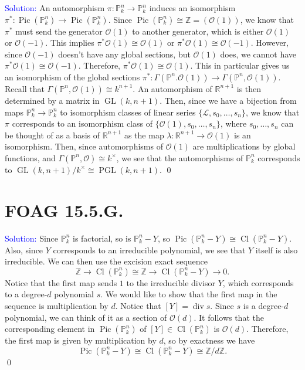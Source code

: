 \documentclass[11pt]{article}
\newcommand{\PP}{\mathbb{P}}
\newcommand{\RR}{\mathbb{R}}
\newcommand{\ZZ}{\mathbb{Z}}
\newcommand{\cL}{\mathcal{L}}
\newcommand{\cO}{\mathcal{O}}
\newcommand{\Div}{\operatorname{div}}
\newcommand{\Pic}{\operatorname{Pic}}
\newcommand{\Cl}{\operatorname{Cl}}
\newcommand{\GL}{\operatorname{GL}}
\newcommand{\PGL}{\operatorname{PGL}}
\newenvironment{solution}{\begin{trivlist}\item[]{\textcolor{blue}{Solution:}}}{\qed \end{trivlist}}
\begin{document}
\begin{solution}
    An automorphism $\pi: \PP_k^n \rightarrow \PP_k^n$ induces an isomorphism $\pi^*: \Pic(\PP_k^n) \rightarrow \Pic(\PP_k^n)$. Since $\Pic(\PP_k^n) \cong \ZZ = (\cO(1))$, we know that $\pi^*$ must send the generator $\cO(1)$ to another generator, which is either $\cO(1)$ or $\cO(-1)$. This implies $\pi^* \cO(1) \cong \cO(1)$ or $\pi^* \cO(1) \cong \cO(-1)$. However, since $\cO(-1)$ doesn't have any global sections, but $\cO(1)$ does, we cannot have $\pi^* \cO(1) \cong \cO(-1)$. Therefore, $\pi^* \cO(1) \cong \cO(1)$. This in particular gives us an isomorphism of the global sections $\pi^*: \Gamma(\PP^n. \cO(1)) \rightarrow \Gamma(\PP^n, \cO(1))$. Recall that $\Gamma(\PP^n, \cO(1)) \cong k^{n+1}$. An automorphism of $\RR^{n+1}$ is then determined by a matrix in $\GL(k, n+1)$. Then, since we have a bijection from maps $\PP_k^n \rightarrow \PP_k^n$ to isomorphism classes of linear series $\{\cL, s_0, \ldots, s_n\}$, we know that $\pi$ corresponds to an isomorphism class of $\{\cO(1), s_0, \ldots, s_n\}$, where $s_0, \ldots, s_n$ can be thought of as a basis of $\RR^{n+1}$ as the map $\lambda: \RR^{n+1} \rightarrow \cO(1)$ is an isomorphism. Then, since automorphisms of $\cO(1)$ are multiplications by global functions, and $\Gamma(\PP^n, \cO) \cong k^\times$, we see that the automorphisms of $\PP_k^n$ corresponds to $\GL(k, n+1) / k^\times \cong \PGL(k, n+1)$. 
\end{solution}

\newpage

\section*{FOAG 15.5.G.}

\begin{solution}
    Since $\PP_k^n$ is factorial, so is $\PP_k^n - Y$, so $\Pic(\PP_k^n - Y) \cong \Cl(\PP_k^n - Y)$. Also, since $Y$ corresponds to an irreducible polynomial, we see that $Y$ itself is also irreducible. We can then use the excision exact sequence 
    \begin{equation*}
        \ZZ \longrightarrow \Cl (\PP_k^n) \cong \ZZ \longrightarrow \Cl (\PP_k^n - Y) \longrightarrow 0.
    \end{equation*} 
    Notice that the first map sends $1$ to the irreducible divisor $Y$, which corresponds to a degree-$d$ polynomial $s$. We would like to show that the first map in the sequence is multiplication by $d$. Notice that $[Y] = \Div s$. Since $s$ is a degree-$d$ polynomial, we can think of it as a section of $\cO(d)$. It follows that the corresponding element in $\Pic(\PP_k^n)$ of $[Y] \in \Cl(\PP_k^n)$ is $\cO(d)$. Therefore, the first map is given by multiplication by $d$, so by exactness we have 
    \begin{equation*}
        \Pic (\PP_k^n - Y) \cong \Cl (\PP_k^n - Y) \cong \ZZ / d\ZZ.
    \end{equation*}
\end{solution}
\end{document}

